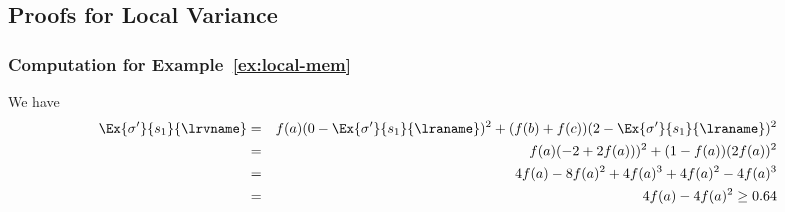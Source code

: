 \subsection{Proofs for Local Variance}
\label{app-local}
\subsubsection{Computation for Example~\ref{ex:local-mem}}\label{app:local-example}
We have
\begin{eqnarray*}
 \Ex{\sigma'}{s_1}{\lrvname} &=&  f(a)(0-\Ex{\sigma'}{s_1}{\lraname})^2 +  (f(b)+f(c))(2-\Ex{\sigma'}{s_1}{\lraname})^2\\
 &=& f(a)(-2+2f(a)))^2 + (1 - f(a))(2f(a))^2\\
 &=& 4f(a) - 8f(a)^2 + 4f(a)^3 + 4f(a)^2 - 4f(a)^3\\
 &=& 4f(a) - 4f(a)^2 \ge 0.64
\end{eqnarray*}

